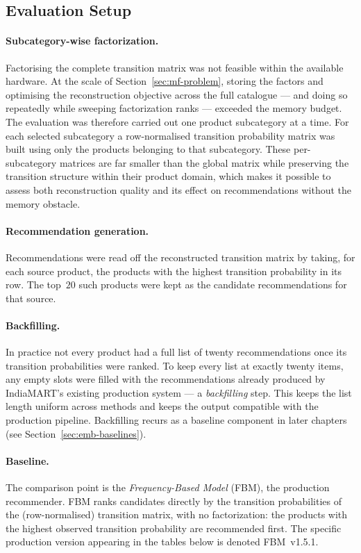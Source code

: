 \subsection{Evaluation Setup}
\label{sec:mf-ctr-setup}

\paragraph{Subcategory-wise factorization.}
Factorising the complete transition matrix was not feasible within the available
hardware. At the scale of Section~\ref{sec:mf-problem}, storing the factors and
optimising the reconstruction objective across the full catalogue --- and doing
so repeatedly while sweeping factorization ranks --- exceeded the memory budget.
The evaluation was therefore carried out one product subcategory at a time. For
each selected subcategory a row-normalised transition probability matrix was
built using only the products belonging to that subcategory. These per-%
subcategory matrices are far smaller than the global matrix while preserving the
transition structure within their product domain, which makes it possible to
assess both reconstruction quality and its effect on recommendations without the
memory obstacle.

\paragraph{Recommendation generation.}
Recommendations were read off the reconstructed transition matrix by taking, for
each source product, the products with the highest transition probability in its
row. The top~$20$ such products were kept as the candidate recommendations for
that source.

\paragraph{Backfilling.}
In practice not every product had a full list of twenty recommendations once its
transition probabilities were ranked. To keep every list at exactly twenty
items, any empty slots were filled with the recommendations already produced by
IndiaMART's existing production system --- a \emph{backfilling} step. This keeps
the list length uniform across methods and keeps the output compatible with the
production pipeline. Backfilling recurs as a baseline component in later chapters
(see Section~\ref{sec:emb-baselines}).

\paragraph{Baseline.}
The comparison point is the \emph{Frequency-Based Model} (FBM), the production
recommender. FBM ranks candidates directly by the transition probabilities of
the (row-normalised) transition matrix, with no factorization: the products with
the highest observed transition probability are recommended first. The specific
production version appearing in the tables below is denoted FBM~v1.5.1.

